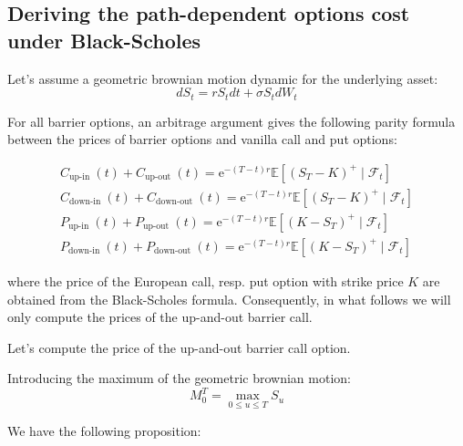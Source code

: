 \subsection{Deriving the path-dependent options cost under Black-Scholes}

Let's assume a geometric brownian motion dynamic for the underlying asset: \[dS_t = r S_t dt + \sigma S_t dW_t\]

For all barrier options, an arbitrage argument gives the following parity formula between the prices of barrier options and vanilla call and put options:

\[
\begin{array}{l}
C_{\text {up-in }}(t)+C_{\text {up-out }}(t)=\mathrm{e}^{-(T-t) r} \mathbb{E}\left[\left(S_{T}-K\right)^{+} \mid \mathcal{F}_{t}\right] \\
C_{\text {down-in }}(t)+C_{\text {down-out }}(t)=\mathrm{e}^{-(T-t) r} \mathbb{E}\left[\left(S_{T}-K\right)^{+} \mid \mathcal{F}_{t}\right] \\
P_{\text {up-in }}(t)+P_{\text {up-out }}(t)=\mathrm{e}^{-(T-t) r} \mathbb{E}\left[\left(K-S_{T}\right)^{+} \mid \mathcal{F}_{t}\right] \\
P_{\text {down-in }}(t)+P_{\text {down-out }}(t)=\mathrm{e}^{-(T-t) r} \mathbb{E}\left[\left(K-S_{T}\right)^{+} \mid \mathcal{F}_{t}\right]
\end{array}
\]

where the price of the European call, resp. put option with strike price $K$ are obtained from the Black-Scholes formula.
Consequently, in what follows we will only compute the prices of the up-and-out barrier call.

Let's compute the price of the up-and-out barrier call option.

Introducing the maximum of the geometric brownian motion: \[M_{0}^{T}=\max _{0 \leq u \leq T} S_{u}\]

We have the following proposition:

